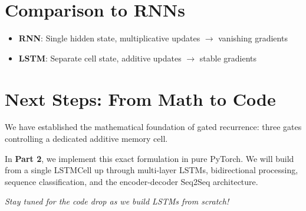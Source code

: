 \documentclass[12pt]{article}
\begin{document}
\section*{Comparison to RNNs}
\begin{itemize}
    \item \textbf{RNN}: Single hidden state, multiplicative updates $\rightarrow$ vanishing gradients
    \item \textbf{LSTM}: Separate cell state, additive updates $\rightarrow$ stable gradients
\end{itemize}

\section*{Next Steps: From Math to Code}
We have established the mathematical foundation of gated recurrence: three gates controlling a dedicated additive memory cell.

In \textbf{Part 2}, we implement this exact formulation in pure PyTorch. We will build from a single LSTMCell up through multi-layer LSTMs, bidirectional processing, sequence classification, and the encoder-decoder Seq2Seq architecture.

\vspace{1em}
\noindent \textit{Stay tuned for the code drop as we build LSTMs from scratch!}
\end{document}
